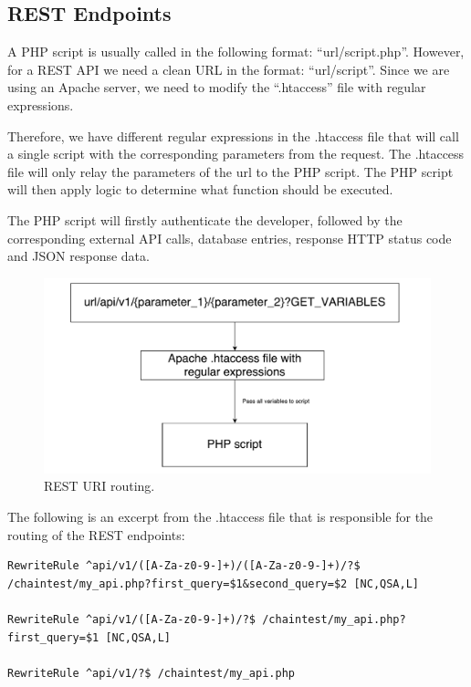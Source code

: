 \subsection{REST Endpoints}

A PHP script is usually called in the following format: ``url/script.php''. However, for a REST API we need a clean URL in the format: ``url/script''. Since we are using an Apache server, we need to modify the ``.htaccess'' file with regular expressions.

Therefore, we have different regular expressions in the .htaccess file that will call a single script with the corresponding parameters from the request. The .htaccess file will only relay the parameters of the url to the PHP script. The PHP script will then apply logic to determine what function should be executed. 

The PHP script will firstly authenticate the developer, followed by the corresponding external API calls, database entries, response HTTP status code and JSON response data.

\begin{figure}
  \centering
    \caption{REST URI routing.} 
    \includegraphics[width=\textwidth]{figs/htaccess_file.pdf}
   
   \label{fig:htaccess_file}
\end{figure}

The following is an excerpt from the .htaccess file that is responsible for the routing of the REST endpoints:
\begin{tiny}
\begin{verbatim}
RewriteRule ^api/v1/([A-Za-z0-9-]+)/([A-Za-z0-9-]+)/?$ 
/chaintest/my_api.php?first_query=$1&second_query=$2 [NC,QSA,L]

RewriteRule ^api/v1/([A-Za-z0-9-]+)/?$ /chaintest/my_api.php?first_query=$1 [NC,QSA,L]

RewriteRule ^api/v1/?$ /chaintest/my_api.php
\end{verbatim}
\end{tiny}

